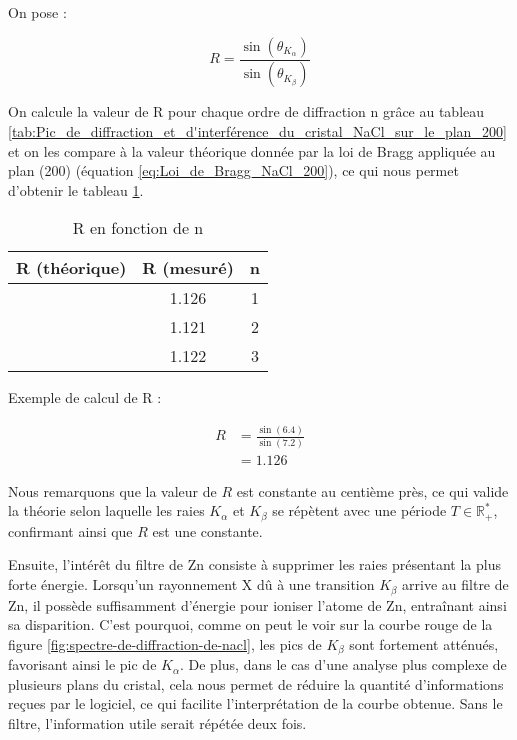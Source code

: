 \begin{flushleft}
On pose :

\begin{equation}
	R = \frac{\sin(\theta_{K_{\alpha}})}{\sin(\theta_{K_{\beta}})}
\end{equation}

On calcule la valeur de R pour chaque ordre de diffraction n grâce au tableau \ref{tab:Pic_de_diffraction_et_d'interférence_du_cristal_NaCl_sur_le_plan_200} et on les compare à la valeur théorique donnée par la loi de Bragg appliquée au plan (200) (équation \ref{eq:Loi_de_Bragg_NaCl_200}), ce qui nous permet d'obtenir le tableau \ref{tab:R en fonction de n}.
	
	
	
	



\begin{table}[h!]
	\centering
	\begin{tabular}{|c|c|c|}
		\hline
		R (théorique)& R (mesuré) & n \\ \hline
		&1.126 & 1 \\ \hline
		&1.121& 2 \\ \hline
		& 1.122& 3 \\ \hline
	\end{tabular}
	\caption{R en fonction de n}
	\label{tab:R en fonction de n}
\end{table}

Exemple de calcul de R :

\begin{equation*}
	\begin{split}
		R & = \frac{\sin(6.4)}{\sin(7.2)}  \\
		& = 1.126 
	\end{split}		
\end{equation*}



Nous remarquons que la valeur de $R$ est constante au centième près, ce qui valide la théorie selon laquelle les raies $K_{\alpha}$ et $K_{\beta}$ se répètent avec une période  $T \in \mathbb{R^*_+}$, confirmant ainsi que $R$ est une constante.







 
Ensuite, l'intérêt du filtre de Zn consiste à supprimer les raies présentant la plus forte énergie. Lorsqu'un rayonnement X dû à une transition $K_{\beta}$ arrive au filtre de Zn, il possède suffisamment d'énergie pour ioniser l'atome de Zn, entraînant ainsi sa disparition. C'est pourquoi, comme on peut le voir sur la courbe rouge de la figure \ref{fig:spectre-de-diffraction-de-nacl}, les pics de $K_{\beta}$ sont fortement atténués, favorisant ainsi le pic de $K_{\alpha}$. De plus, dans le cas d'une analyse plus complexe de plusieurs plans du cristal, cela nous permet de réduire la quantité d'informations reçues par le logiciel, ce qui facilite l'interprétation de la courbe obtenue. Sans le filtre, l'information utile serait répétée deux fois.





\end{flushleft}
